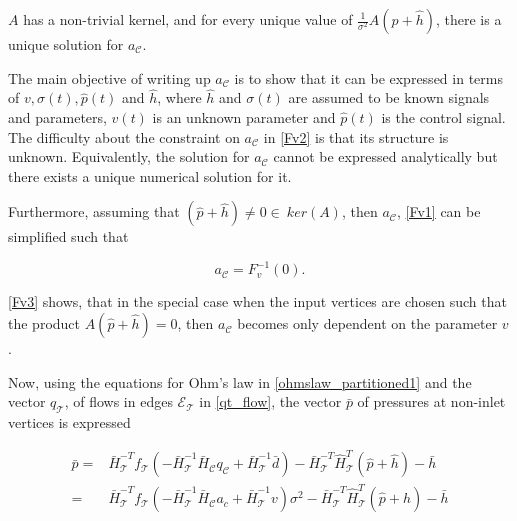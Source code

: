 $A$ has a non-trivial kernel, and for every unique value of $\frac{1}{\sigma^2} A (\hat{p}+\hat{h}) $, there is a unique solution for $a_{\mathcal{C}}$.


The main objective of writing up $a_{\mathcal{C}}$ is to show that it can be expressed in terms of $v, \sigma(t), \hat{p}(t)$ and $\hat{h}$, where $\hat{h}$ and $\sigma(t)$ are assumed to be known signals and parameters, $v(t)$ is an unknown parameter and $\hat{p}(t)$ is the control signal. The difficulty about the constraint on $a_{\mathcal{C}}$ in \eqref{Fv2} is that its structure is unknown. Equivalently, the solution for $a_{\mathcal{C}}$ cannot be expressed analytically but there exists a unique numerical solution for it.  

Furthermore, assuming that $(\hat{p} + \hat{h}) \neq 0 \in \: ker(A)$, then $a_{\mathcal{C}}$, \eqref{Fv1} can be simplified such that 

\begin{equation}
\label{Fv3}
a_{\mathcal{C}} = F_v^{-1} (0).
\end{equation}

\eqref{Fv3} shows, that in the special case when the input vertices are chosen such that the product $A(\hat{p} + \hat{h}) = 0$, then $a_{\mathcal{C}}$ becomes only dependent on the parameter $v$. 

Now, using the equations for Ohm's law in \eqref{ohmslaw_partitioned1} and the vector $q_{\mathcal{T}}$, of flows in edges $\mathcal{E}_{\mathcal{T}}$ in \eqref{qt_flow}, the vector $\bar{p}$ of pressures at non-inlet vertices is expressed

\begin{equation}
\begin{split}
  \label{non-inlet_p1}
  \bar{p} = & \bar{H}^{-T}_{\mathcal{T}}f_{\mathcal{T}}(-\bar{H}^{-1}_{\mathcal{T}} \bar{H}_{\mathcal{C}} q_\mathcal{C} + \bar{H}^{-1}_{\mathcal{T}} \bar{d}) - \bar{H}^{-T}_{\mathcal{T}}\hat{H}^{T}_{\mathcal{T}} (\hat{p} + \hat{h}) - \bar{h} \\
  =&\bar{H}^{-T}_{\mathcal{T}}f_{\mathcal{T}}(-\bar{H}^{-1}_{\mathcal{T}} \bar{H}_{\mathcal{C}} a_c + \bar{H}^{-1}_{\mathcal{T}} v)\sigma^2 - \bar{H}^{-T}_{\mathcal{T}}\hat{H}^{T}_{\mathcal{T}} (\hat{p} + \hat{h}) - \bar{h}
\end{split}
\end{equation}

